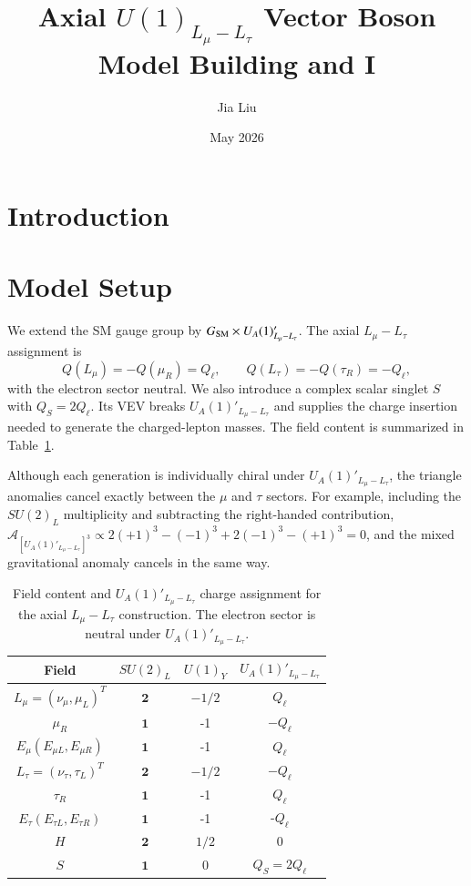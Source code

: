 \documentclass[onecolumn, aps, nofootinbib, prd, preprint, floats, floatfix, amsmath, amssymb, superscriptaddress, preprintnumbers]{revtex4-1}
\begin{document}
\title{Axial $U(1)_{L_\mu-L_\tau}$ Vector Boson Model Building and I}
\author{Jia Liu}
\date{May 2026}


\maketitle
\tableofcontents

\section{Introduction}

\section{Model Setup}
\label{sec:model-setup}



We extend the SM gauge group by \(G_{\rm SM}\times U_A(1)'_{L_\mu-L_\tau}\). The axial \(L_\mu-L_\tau\) assignment is
\[
Q(L_\mu)=-Q(\mu_R)=Q_\ell,\qquad
Q(L_\tau)=-Q(\tau_R)=-Q_\ell ,
\]
with the electron sector neutral. We also introduce a complex scalar singlet \(S\) with \(Q_S=2Q_\ell\). Its VEV breaks \(U_A(1)'_{L_\mu-L_\tau}\) and supplies the charge insertion needed to generate the charged-lepton masses. The field content is summarized in Table~\ref{tab:charge-assignment}.

Although each generation is individually chiral under \(U_A(1)'_{L_\mu-L_\tau}\), the triangle anomalies cancel exactly between the \(\mu\) and \(\tau\) sectors. For example, including the \(SU(2)_L\) multiplicity and subtracting the right-handed contribution, \(\mathcal{A}_{[U_A(1)'_{L_\mu-L_\tau}]^3} \propto 2(+1)^3-(-1)^3+2(-1)^3-(+1)^3=0\), and the mixed gravitational anomaly cancels in the same way.
\begin{table}[htbp]
    \centering
    \begin{tabular}{cccc}
    \hline
    Field & $SU(2)_L$ & $U(1)_Y$ & $U_A(1)'_{L_\mu-L_\tau}$ \\
    \hline
    $L_{\mu}=\left(\nu_{\mu}, \mu_L\right)^T$ & $\mathbf{2}$ & $-1 / 2$ & $Q_{\ell}$ \\
    \hline
    $\mu_R$ & $\mathbf{1}$ & -1 & $-Q_\ell$ \\
    \hline
    $E_\mu\left(E_{\mu L}, E_{\mu R}\right)$ & $\mathbf{1}$ & -1 & $Q_\ell$\\
    \hline
    $L_{\tau}=\left(\nu_{\tau}, \tau_L\right)^T$ & $\mathbf{2}$ & $-1 / 2$ & $-Q_\ell$ \\
    \hline
    $\tau_R$ & $\mathbf{1}$ & -1 & $Q_\ell$ \\
    \hline
    $E_\tau\left(E_{\tau L}, E_{\tau R}\right)$ & $\mathbf{1}$ & -1 & -$Q_\ell$\\
    \hline
    $H$ & $\mathbf{2}$ & $1 / 2$ & 0 \\
    $S$ & $\mathbf{1}$ & 0 & $Q_S=2Q_\ell$\\
    \hline
    \end{tabular}
    \caption{Field content and \(U_A(1)'_{L_\mu-L_\tau}\) charge assignment for the axial \(L_\mu-L_\tau\) construction. The electron sector is neutral under \(U_A(1)'_{L_\mu-L_\tau}\).}
    \label{tab:charge-assignment}
\end{table}
\end{document}
